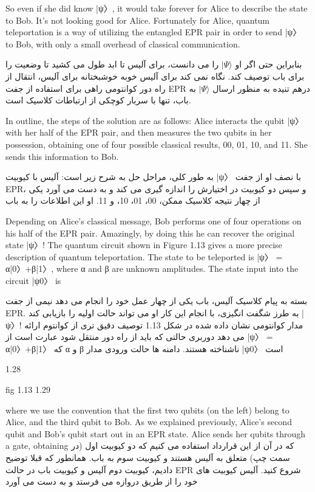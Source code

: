 \documentclass{book}
\begin{document}
 So even if she did know |ψ〉, it would take forever for Alice to describe the state to Bob. It’s not looking
good for Alice. Fortunately for Alice, quantum teleportation is a way of utilizing the entangled EPR pair in order to send |ψ〉 to Bob, with only a small overhead of classical communication.

بنابراین حتی اگر او $\vert \Psi \rangle$ را می دانست، برای آلیس تا ابد طول می کشید تا وضعیت را برای باب توصیف کند. نگاه نمی کند برای آلیس خوبه خوشبختانه برای آلیس، انتقال از راه دور کوانتومی راهی برای استفاده از جفت EPR درهم تنیده به منظور ارسال $\vert \Psi \rangle$ به باب، تنها با سربار کوچکی از ارتباطات کلاسیک است.


In outline, the steps of the solution are as follows: Alice interacts the qubit |ψ〉 with
her half of the EPR pair, and then measures the two qubits in her possession, obtaining
one of four possible classical results, 00, 01, 10, and 11. She sends this information to
Bob. 

به طور کلی، مراحل حل به شرح زیر است: آلیس با کیوبیت |ψ〉 با
نصف او از جفت EPR، و سپس دو کیوبیت در اختیارش را اندازه گیری می کند و به دست می آورد
یکی از چهار نتیجه کلاسیک ممکن، 00، 01، 10، و 11. او این اطلاعات را به
باب


Depending on Alice’s classical message, Bob performs one of four operations on his
half of the EPR pair. Amazingly, by doing this he can recover the original state |ψ〉!
The quantum circuit shown in Figure 1.13 gives a more precise description of quantum
teleportation. The state to be teleported is |ψ〉 = α|0〉+β|1〉, where α and β are unknown
amplitudes. The state input into the circuit |ψ0〉 is

بسته به پیام کلاسیک آلیس، باب یکی از چهار عمل خود را انجام می دهد
نیمی از جفت EPR. به طرز شگفت انگیزی، با انجام این کار او می تواند حالت اولیه را بازیابی کند |ψ〉!
مدار کوانتومی نشان داده شده در شکل 1.13 توصیف دقیق تری از کوانتوم ارائه می دهد
دوربری حالتی که باید از راه دور منتقل شود عبارت است از |ψ〉 = α|0〉+β|1〉 که α و β ناشناخته هستند.
دامنه ها حالت ورودی مدار |ψ0〉 است


1.28

fig 1.13
1.29


where we use the convention that the first two qubits (on the left) belong to Alice, and
the third qubit to Bob. As we explained previously, Alice’s second qubit and Bob’s qubit
start out in an EPR state. Alice sends her qubits through a gate, obtaining
که در آن از این قرارداد استفاده می کنیم که دو کیوبیت اول (در سمت چپ) متعلق به آلیس هستند و
کیوبیت سوم به باب. همانطور که قبلا توضیح دادیم، کیوبیت دوم آلیس و کیوبیت باب
در حالت EPR شروع کنید. آلیس کیوبیت های خود را از طریق دروازه می فرستد و به دست می آورد
\end{document}
